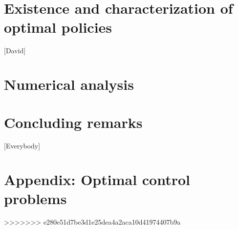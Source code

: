 \documentclass[a4paper]{amsart}
\begin{document}
	\section{Existence and characterization of optimal policies}
		[David]
	
\section{Numerical analysis}
		
	\section{Concluding remarks}
		[Everybody]
%
	\section{Appendix: Optimal control problems}
		
	
	
>>>>>>> e280e51d7be3d1e25dea4a2aca10d41974407b9a
\end{document}
